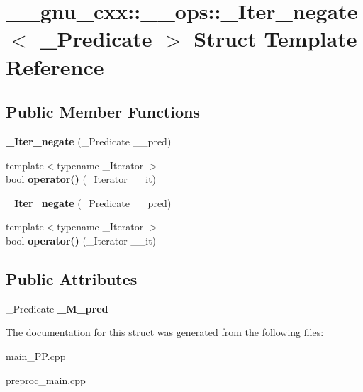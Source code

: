 \hypertarget{struct____gnu__cxx_1_1____ops_1_1__Iter__negate}{\section{\+\_\+\+\_\+gnu\+\_\+cxx\+:\+:\+\_\+\+\_\+ops\+:\+:\+\_\+\+Iter\+\_\+negate$<$ \+\_\+\+Predicate $>$ Struct Template Reference}
\label{struct____gnu__cxx_1_1____ops_1_1__Iter__negate}
}
\subsection*{Public Member Functions}
\begin{DoxyCompactItemize}
\item 
\hypertarget{struct____gnu__cxx_1_1____ops_1_1__Iter__negate_aec59bb0d5017261eb7f3d5895d0f8fe8}{{\bfseries \+\_\+\+Iter\+\_\+negate} (\+\_\+\+Predicate \+\_\+\+\_\+pred)}\label{struct____gnu__cxx_1_1____ops_1_1__Iter__negate_aec59bb0d5017261eb7f3d5895d0f8fe8}

\item 
\hypertarget{struct____gnu__cxx_1_1____ops_1_1__Iter__negate_a70a09b74ea8f8697ab916f1909be63db}{{\footnotesize template$<$typename \+\_\+\+Iterator $>$ }\\bool {\bfseries operator()} (\+\_\+\+Iterator \+\_\+\+\_\+it)}\label{struct____gnu__cxx_1_1____ops_1_1__Iter__negate_a70a09b74ea8f8697ab916f1909be63db}

\item 
\hypertarget{struct____gnu__cxx_1_1____ops_1_1__Iter__negate_aec59bb0d5017261eb7f3d5895d0f8fe8}{{\bfseries \+\_\+\+Iter\+\_\+negate} (\+\_\+\+Predicate \+\_\+\+\_\+pred)}\label{struct____gnu__cxx_1_1____ops_1_1__Iter__negate_aec59bb0d5017261eb7f3d5895d0f8fe8}

\item 
\hypertarget{struct____gnu__cxx_1_1____ops_1_1__Iter__negate_a70a09b74ea8f8697ab916f1909be63db}{{\footnotesize template$<$typename \+\_\+\+Iterator $>$ }\\bool {\bfseries operator()} (\+\_\+\+Iterator \+\_\+\+\_\+it)}\label{struct____gnu__cxx_1_1____ops_1_1__Iter__negate_a70a09b74ea8f8697ab916f1909be63db}

\end{DoxyCompactItemize}
\subsection*{Public Attributes}
\begin{DoxyCompactItemize}
\item 
\hypertarget{struct____gnu__cxx_1_1____ops_1_1__Iter__negate_a7fd7d3f3fad38a132f79b4ba0e37aea5}{\+\_\+\+Predicate {\bfseries \+\_\+\+M\+\_\+pred}}\label{struct____gnu__cxx_1_1____ops_1_1__Iter__negate_a7fd7d3f3fad38a132f79b4ba0e37aea5}

\end{DoxyCompactItemize}


The documentation for this struct was generated from the following files\+:\begin{DoxyCompactItemize}
\item 
main\+\_\+\+P\+P.\+cpp\item 
preproc\+\_\+main.\+cpp\end{DoxyCompactItemize}
